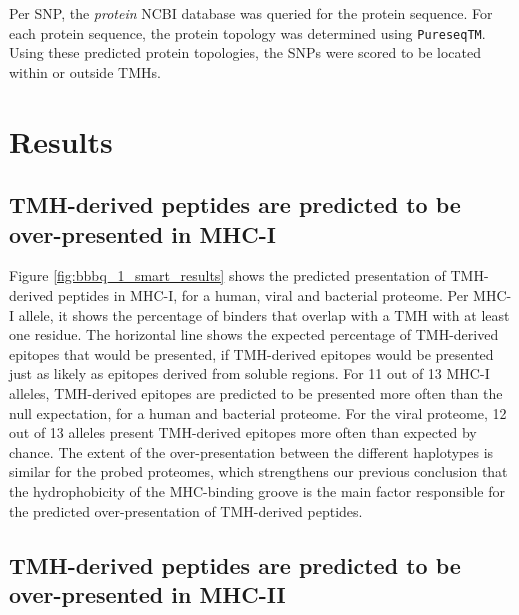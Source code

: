 Per SNP, the \emph{protein} NCBI database was queried for the
protein sequence. For each protein sequence, the protein topology was determined using \verb;PureseqTM;. Using these predicted protein topologies, the SNPs were scored to be located within or outside TMHs.


\section{Results}

\subsection{TMH-derived peptides are predicted to be over-presented in MHC-I}

Figure \ref{fig:bbbq_1_smart_results} shows the predicted presentation of TMH-derived peptides in MHC-I,
for a human, viral and bacterial proteome.
Per MHC-I allele, it shows the percentage of binders that overlap with a TMH 
with at least one residue.
The horizontal line shows the expected percentage of TMH-derived epitopes 
that would be presented, if TMH-derived epitopes would be presented just as 
likely as epitopes derived from soluble regions.
For 11 out of 13 MHC-I alleles, TMH-derived epitopes are predicted to be presented more often 
than the null expectation, for a human and bacterial proteome.
For the viral proteome, 12 out of 13 alleles present
TMH-derived epitopes more often than expected by chance.
The extent of the over-presentation between the different haplotypes 
is similar for the probed proteomes, 
which strengthens our previous conclusion \cite{bianchi2017} 
that the hydrophobicity of the MHC-binding groove 
is the main factor responsible for the predicted over-presentation 
of TMH-derived peptides.



\subsection{TMH-derived peptides are predicted to be over-presented in MHC-II}

